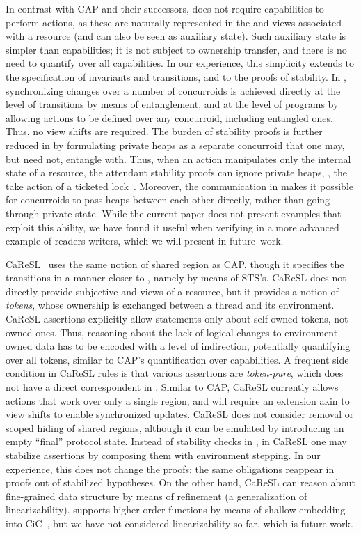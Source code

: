 In contrast with CAP and their successors, \SCST does not require
capabilities to perform actions, as these are naturally represented in
the \self and \other views associated with a resource (and can also be
seen as auxiliary state). Such auxiliary state is simpler than
capabilities; it is not subject to ownership transfer, and there is no
need to quantify over all capabilities. In our experience, this
simplicity extends to the specification of invariants and transitions,
and to the proofs of stability. In \SCST, synchronizing changes over a
number of concurroids is achieved directly at the level of transitions
by means of entanglement, and at the level of programs by allowing
actions to be defined over any concurroid, including entangled
ones. Thus, no view shifts are required.
%
The burden of stability proofs is further reduced in \SCST by
formulating private heaps as a separate concurroid that one may, but
need not, entangle with. Thus, when an action manipulates only the
internal state of a resource, the attendant stability proofs can
ignore private heaps, \eg, the \textsf{take} action of a ticketed
lock~\cite{DinsdaleYoung-al:ECOOP10,fcsl-coqscripts}.
%
Moreover, the communication in \SCST makes it possible for concurroids
to pass heaps between each other directly, rather than going through
private state. While the current paper does not present examples that
exploit this ability, we have found it useful when verifying in \SCST
a more advanced example of readers-writers, which we will present in
future~work.

CaReSL~\cite{Turon-al:ICFP13} uses the same notion of shared region as
CAP, though it specifies the transitions in a manner closer to \SCST,
namely by means of STS's. CaReSL does not directly provide subjective
\self and \other views of a resource, but it provides a notion of
\emph{tokens}, whose ownership is exchanged between a thread and its
environment. CaReSL assertions explicitly allow statements only about
self-owned tokens, not \other-owned ones. Thus, reasoning about the
lack of logical changes to environment-owned data has to be encoded
with a level of indirection, potentially quantifying over all tokens,
similar to CAP's quantification over capabilities. A frequent side
condition in CaReSL rules is that various assertions are
\emph{token-pure}, which does not have a direct correspondent in
\SCST.
%
Similar to CAP, CaReSL currently allows actions that work over only a
single region, and will require an extension akin to view shifts to
enable synchronized updates. 
%
CaReSL does not consider removal or scoped hiding of shared regions,
although it can be emulated by introducing an empty ``final'' protocol
state.
%
Instead of stability checks in \SCST, in CaReSL one may stabilize
assertions by composing them with environment stepping. In our
experience, this does not change the proofs: the same obligations
reappear in proofs out of stabilized hypotheses.
%
On the other hand, CaReSL can reason about fine-grained data structure
by means of refinement (a generalization of linearizability). \SCST
supports higher-order functions by means of shallow embedding into
CiC~\cite{Bertot-Casteran:04,coq-team}, but we have not considered
linearizability so far, which is future work.

